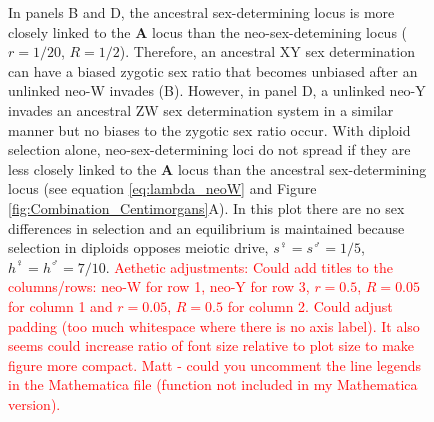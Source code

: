 \documentclass[12pt]{article}
\begin{document}
\begin{figure}[!h]
{In panels B and D, the ancestral sex-determining locus is more closely linked to the \textbf{A} locus than the neo-sex-detemining locus ($r=1/20$, $R=1/2$). 
Therefore, an ancestral XY sex determination can have a biased zygotic sex ratio that becomes unbiased after an unlinked neo-W invades (B). 
However, in panel D, a unlinked neo-Y invades an ancestral ZW sex determination system in a similar manner but no biases to the zygotic sex ratio occur. 
With diploid selection alone, neo-sex-determining loci do not spread if they are less closely linked to the \textbf{A} locus than the ancestral sex-determining locus (see equation \eqref{eq:lambda_neoW} and Figure \ref{fig:Combination_Centimorgans}A). 
In this plot there are no sex differences in selection and an equilibrium is maintained because selection in diploids opposes meiotic drive, $s^\female =s^\male = 1/5$, $h^\female = h^\male = 7/10$.
\textcolor{red}{Aethetic adjustments: Could add titles to the columns/rows: neo-W for row 1, neo-Y for row 3, $r=0.5$, $R=0.05$ for column 1 and $r=0.05$, $R=0.5$ for column 2. Could adjust padding (too much whitespace where there is no axis label). It also seems could increase ratio of font size relative to plot size to make figure more compact. Matt - could you uncomment the line legends in the Mathematica file (function not included in my Mathematica version).}
}
\label{fig:Combination_Turnover}
\end{figure}
\newpage
\end{document}
